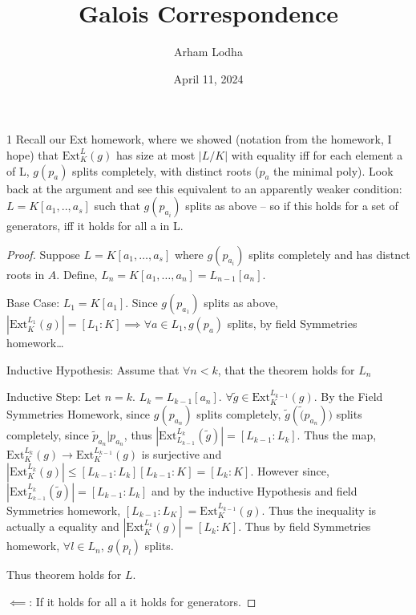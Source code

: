 \documentclass{article}
\newcommand{\ext}[2]{\text{Ext}_{#1}^{#2}}
\begin{document}
\title{Galois Correspondence}
\author{Arham Lodha}%
\date{April 11, 2024}%
\maketitle

\begin{PROB}{1}\label{Problem 1.}
    Recall our Ext homework, where we showed (notation from the homework, I hope) that $\ext{K}{L}(g)$ has size at most $|L/K|$ with equality iff for each  element a of L, $g(p_a)$ splits completely, with distinct roots ($p_a$ the minimal poly).  Look back at the argument and see this equivalent to an apparently weaker condition: $L = K[a_1,..,a_s]$ such that $g(p_{a_i})$ splits as above -- so if this holds for a set of generators, iff it holds for all a  in L.
\end{PROB}
\begin{proof}
    Suppose $L = K[a_1, \dots, a_s]$ where $g(p_{a_i})$ splits completely and has distnct roots in $A$. Define, $L_{n} = K[a_1, \dots, a_n] = L_{n - 1}[a_n]$. 
    
    Base Case: $L_1 = K[a_1]$. Since $g(p_{a_1})$ splits as above, $|\ext{K}{L_1}(g)| = [L_1 : K] \implies \forall a \in L_1, g(p_a)$ splits, by field Symmetries homework\dots
    
    Inductive Hypothesis: Assume that $\forall n < k$, that the theorem holds for $L_{n}$  

    Inductive Step: Let $n = k$. $L_{k} = L_{k - 1}[a_n]$. $\forall \tilde{g} \in \ext{K}{L_{k - 1}}(g)$. By the Field Symmetries Homework, since $g(p_{a_n})$ splits completely, $\tilde{g}(\tilde(p_{a_n}))$ splits completely, since $\tilde{p}_{a_n} | p_{a_n}$, thus $|\ext{L_{k - 1}}{L_k}(\tilde{g})| = [L_{k - 1} : L_k]$. Thus the map, $\ext{K}{L_k}(g) \to \ext{K}{L_{k - 1}}(g)$ is surjective and $|\ext{K}{L_k}(g)| \leq [L_{k - 1} : L_k][L_{k - 1} : K] = [L_k : K]$. However since, $|\ext{L_{k - 1}}{L_k}(\tilde{g})| = [L_{k - 1} : L_k]$ and by the inductive Hypothesis and field Symmetries homework, $[L_{k - 1} : L_K] = \ext{K}{L_{k-1}}(g)$. Thus the inequality is actually a equality and $|\ext{K}{L_k}(g)| = [L_k : K]$. Thus by field Symmetries homework, $\forall l \in L_n$, $g(p_l)$ splits. 
    
    
    Thus theorem holds for $L$.   
    


    $\impliedby$: If it holds for all a it holds for generators.  
\end{proof}
\end{document}
